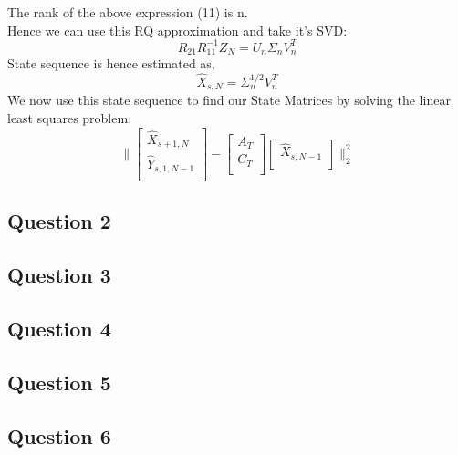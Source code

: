 \documentclass[12pt]{report}
\begin{document}
The rank of the above expression (11) is n.\\
Hence we can use this RQ approximation and take it's SVD:\\
\begin{equation*}
R_{21} R_{11}^{-1} Z_N = U_n \Sigma_n V_n^T
\end{equation*}
State sequence is hence estimated as,
\begin{equation*}
\hat{X}_{s,N} = \Sigma_n^{1/2} V_n^T
\end{equation*}
We now use this state sequence to find our State Matrices by solving the linear least squares problem:
\begin{equation*}
\|
\begin{bmatrix}
\hat{X}_{s+1,N}\\
\hat{Y}_{s,1,N-1}\\
\end{bmatrix}
- \begin{bmatrix}
A_T\\
C_T\\
\end{bmatrix}
\begin{bmatrix}
\hat{X}_{s,N-1}\\
\end{bmatrix}
\|_{2}^2
\end{equation*}
\subsection*{Question 2}


\subsection*{Question 3}

\subsection*{Question 4}

\subsection*{Question 5}

\subsection*{Question 6}

\newpage
\end{document}
